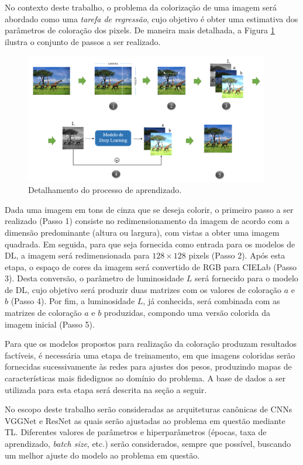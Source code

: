 No contexto deste trabalho, o problema da colorização de uma imagem será abordado como uma \emph{tarefa de regressão}, cujo objetivo é obter uma estimativa dos parâmetros de coloração dos pixels. De maneira mais detalhada, a Figura \ref{fig:aprendizado} ilustra o conjunto de passos a ser realizado.

\begin{figure}[h]
	\centering
	\caption{Detalhamento do processo de aprendizado.}
	\label{fig:aprendizado}
	\includegraphics[width=0.95\textwidth]{./img/aprendizado}
\end{figure}

Dada uma imagem em tons de cinza que se deseja colorir, o primeiro passo a ser realizado (Passo 1) consiste no redimensionamento da imagem de acordo com a dimensão predominante (altura ou largura), com vistas a obter uma imagem quadrada. Em seguida, para que seja fornecida como entrada para os modelos de DL, a imagem será redimensionada para $128 \times 128$ pixels (Passo 2). Após esta etapa, o espaço de cores da imagem será convertido de RGB para CIELab (Passo 3). Desta conversão, o parâmetro de luminosidade $L$ será fornecido para o modelo de DL, cujo objetivo será produzir duas matrizes com os valores de coloração $a$ e $b$ (Passo 4). Por fim, a luminosidade $L$, já conhecida, será combinada com as matrizes de coloração $a$ e $b$ produzidas, compondo uma versão colorida da imagem inicial (Passo 5).

Para que os modelos propostos para realização da coloração produzam resultados factíveis, é necessária uma etapa de treinamento, em que imagens coloridas serão fornecidas sucessivamente às redes para ajustes dos pesos, produzindo mapas de características mais fidedignos ao domínio do problema. A base de dados a ser utilizada para esta etapa será descrita na seção a seguir.

No escopo deste trabalho serão consideradas as arquiteturas canônicas de CNNs VGGNet  e ResNet as quais serão ajustadas ao problema em questão mediante TL. Diferentes valores de parâmetros e hiperparâmetros (épocas, taxa de aprendizado, \emph{batch size}, etc.) serão considerados, sempre que possível, buscando um melhor ajuste do modelo ao problema em questão.

